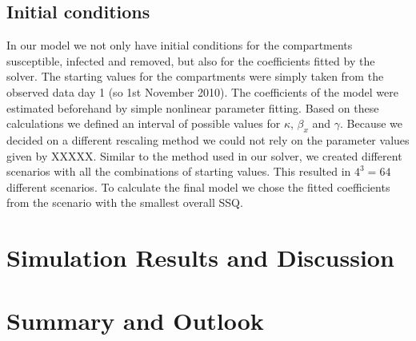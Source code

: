 \documentclass[11pt]{article}
\begin{document}
\subsection{Initial conditions}
\label{sec:initial conditions}
In our model we not only have initial conditions for the compartments susceptible, infected and removed, but also for the coefficients fitted by the solver. The starting values for the compartments were simply taken from the observed data day 1 (so 1st November 2010). The coefficients of the model were estimated beforehand by simple nonlinear parameter fitting. Based on these calculations we defined an interval of possible values for $\kappa$, $\beta_{x}$ and $\gamma$. Because we decided on a different rescaling method we could not rely on the parameter values given by XXXXX. Similar to the method used in our solver, we created different scenarios with all the combinations of starting values. This resulted in $4^{3}=64$ different scenarios. To calculate the final model we chose the fitted coefficients from the scenario with the smallest overall SSQ.










\section{Simulation Results and Discussion}



























\section{Summary and Outlook}
\end{document}
